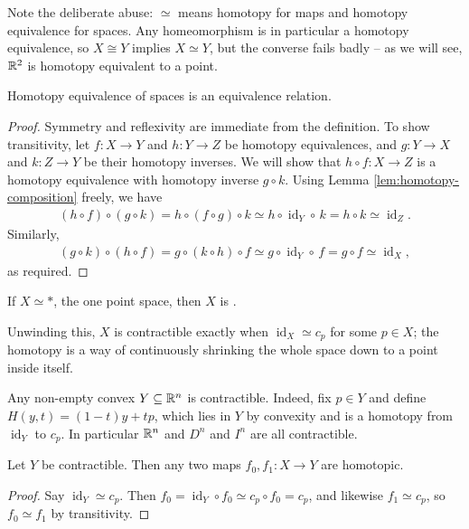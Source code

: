\documentclass[a4paper]{scrartcl}
\newcommand{\id}{\operatorname{id}}
\begin{document}
Note the deliberate abuse: $\simeq$ means homotopy for maps and homotopy equivalence for
spaces. Any homeomorphism is in particular a homotopy equivalence, so $X \cong Y$ implies
$X \simeq Y$, but the converse fails badly -- as we will see, $\mathbb{R}^2$ is homotopy
equivalent to a point.

\begin{proposition}
	Homotopy equivalence of spaces is an equivalence relation.
\end{proposition}
\begin{proof}
	Symmetry and reflexivity are immediate from the definition. To show transitivity, let $f:X \rightarrow Y$ and $h: Y \rightarrow Z$ be homotopy equivalences, and $g: Y \rightarrow X$ and $k: Z \rightarrow Y$ be their homotopy inverses. We will show that $h \circ f : X \rightarrow Z$ is a homotopy equivalence with homotopy inverse $g \circ k$. Using Lemma \ref{lem:homotopy-composition} freely, we have
	\begin{align*}
		(h \circ f) \circ (g \circ k) = h \circ (f \circ g) \circ k \simeq h \circ \id_Y \circ\, k = h \circ k \simeq \id_Z.
	\end{align*}
	Similarly,
	\begin{align*}
		(g \circ k) \circ(h \circ f)=g \circ(k \circ h) \circ f \simeq g \circ \id_Y \circ\, f=g \circ f \simeq \id_X,
	\end{align*}
	as required.
\end{proof}

\begin{definition}[Contractible]
	If $X \simeq *$, the one point space, then $X$ is .
\end{definition}

Unwinding this, $X$ is contractible exactly when $\id_X \simeq c_p$ for some $p \in X$;
the homotopy is a way of continuously shrinking the whole space down to a point inside
itself.

\begin{example}
	Any non-empty convex $Y \subseteq \mathbb{R}^n$ is contractible. Indeed, fix $p \in Y$ and define $H(y, t) = (1-t)y + tp$, which lies in $Y$ by convexity and is a homotopy from $\id_Y$ to $c_p$. In particular $\mathbb{R}^n$ and $D^n$ and $I^n$ are all contractible.
\end{example}

\begin{proposition} \label{prop:contractible-maps}
	Let $Y$ be contractible. Then any two maps $f_0, f_1: X \to Y$ are homotopic.
\end{proposition}
\begin{proof}
	Say $\id_Y \simeq c_p$. Then $f_0 = \id_Y \circ f_0 \simeq c_p \circ f_0 = c_p$, and likewise $f_1 \simeq c_p$, so $f_0 \simeq f_1$ by transitivity.
\end{proof}
\end{document}
